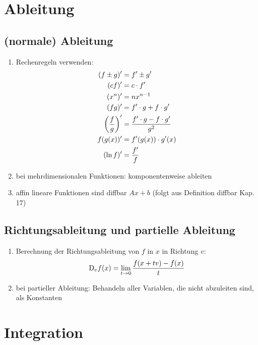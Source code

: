 \documentclass[ngerman,a4paper]{article}
\begin{document}
\section{Ableitung}
\subsection{(normale) Ableitung}
\begin{enumerate}[label=\textbf{\arabic*.}]
	\item Rechenregeln verwenden:
	\begin{align}
		(f\pm g)' &= f'\pm g'\notag \\
		(cf)' &= c\cdot f'\notag \\
		(x^n)' &= nx^{n-1}\notag \\
		(fg)' &= f'\cdot g + f\cdot g' \notag \\
		\left(\frac{f}{g}\right)' &= \frac{f'\cdot g-f\cdot g'}{g^2}\notag \\
		f(g(x))' &= f'(g(x))\cdot g'(x)\notag \\
		(\ln f)' &= \frac{f'}{f}\notag
	\end{align}
	\item bei mehrdimensionalen Funktionen: komponentenweise ableiten
	\item affin lineare Funktionen sind diffbar $Ax+b$ (folgt aus Definition diffbar Kap. 17)
\end{enumerate}

\subsection{Richtungsableitung und partielle Ableitung}
\begin{enumerate}[label=\textbf{\arabic*.}]
	\item Berechnung der Richtungsableitung von $f$ in $x$ in Richtung $v$:
	\begin{align}
		\mathrm{D}_vf(x)=\lim\limits_{t\to 0}\frac{f(x+tv)-f(x)}{t}\notag
	\end{align}
	\item bei partieller Ableitung: Behandeln aller Variablen, die nicht abzuleiten sind, als Konstanten
\end{enumerate}

\section{Integration}
\end{document}

